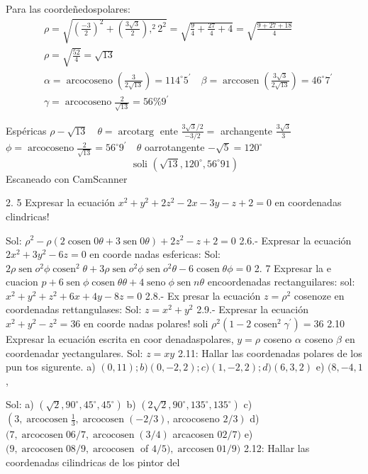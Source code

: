 Para las coordeñedospolares:
$$
\begin{aligned}
	& \rho=\sqrt{\left(\frac{-3}{2}\right)^2+\left(\frac{3 \sqrt{3}}{2}\right),^2 2^2}=\sqrt{\frac{9}{4}+\frac{27}{4}+4}=\sqrt{\frac{9+27+18}{4}} \\
	& \rho=\sqrt{\frac{52}{4}}=\sqrt{13} \\
	& \alpha=\operatorname{arcocoseno}\left(\frac{3}{2 \sqrt{13}}\right)=114^{\circ} 5^{\prime} \quad \beta=\operatorname{arccosen}\left(\frac{3 \sqrt{3}}{2 \sqrt{13}}\right)=46^{\circ} 7^{\prime} \\
	& \gamma=\operatorname{arcocoseno} \frac{2}{\sqrt{13}}=56 \% 9^{\prime}
\end{aligned}
$$

Espéricas $\rho-\sqrt{13} \quad \theta=\operatorname{arcotarg}$ ente $\frac{3 \sqrt{3} / 2}{-3 / 2}=$ archangente $\frac{3 \sqrt{3}}{3}$
$\phi=\operatorname{arcocoseno} \frac{2}{\sqrt{13}}=56^{\circ} 9^{\prime} \quad \theta$ oarrotangente $-\sqrt{5}=120^{\circ}$
$$
\text { soli }\left(\sqrt{13}, 120^{\circ}, 56^{\circ} 91\right)
$$
Escaneado con CamScanner




2. 5 Expresar la ecuación $x^2+y^2+2 z^2-2 x-3 y-z+2=0$ en
coordenadas clindricas!

Sol: $\rho^2-\rho(2 \operatorname{cosen} 0 \theta+3 \operatorname{sen} 0 \theta)+2 z^2-z+2=0$
2.6.- Expresar la ecuación $2 x^2+3 y^2-6 z=0$ en coorde nadas esfericas:
Sol: $2 \rho \operatorname{sen} o^2 \phi \operatorname{cosen}^2 \theta+3 \rho \operatorname{sen} o^2 \phi \operatorname{sen} o^2 \theta-6 \operatorname{cosen} \theta \phi=0$
2. 7 Expresar la e cuacion $p+6 \operatorname{sen} \phi \operatorname{cosen} \theta \theta+4 \operatorname{seno} \phi \operatorname{sen} n \theta$ encoordenadas rectanguilares:
sol: $x^2+y^2+z^2+6 x+4 y-8 z=0$
2.8.- Ex presar la ecuación $z=\rho^2$ cosenoze en coordenadas rettangulases:
Sol: $z=x^2+y^2$
2.9.- Expresar la ecuación $x^2+y^2-z^2=36$ en coorde nadas polares!
soli $\rho^2\left(1-2 \operatorname{cosen}^2 \gamma^{\prime}\right)=36$
2.10 Expresar la ecuación escrita en coor denadaspolares, $y=\rho$ coseno $\alpha$ coseno $\beta$ en coordenadar yectangulares.
Sol: $z=x y$
2.11: Hallar las coordenadas polares de los pun tos sigurente. a) $(0,11) ; b)(0,-2,2) ; c)(1,-2,2) ; d)(6,3,2)$ e) $(8,-4,1$,

Sol: a) $\left(\sqrt{2}, 90^{\circ}, 45^{\circ}, 45^{\circ}\right)$
b) $\left(2 \sqrt{2}, 90^{\circ}, 135^{\circ}, 135^{\circ}\right)$
c) $\left(3, \operatorname{arcocosen} \frac{1}{3}, \operatorname{arcocosen}(-2 / 3)\right.$, arcocoseno $\left.2 / 3\right)$
d) $(7, \operatorname{arcocosen} 06 / 7, \operatorname{arcocosen}(3 / 4)$ arcacosen $02 / 7)$
e) $(9, \operatorname{arcocosen} 08 / 9, \operatorname{arcocosen}$ of $4 / 5), \operatorname{arccosen} 01 / 9)$
2.12: Hallar las coordenadas cilindricas de los pintor del

